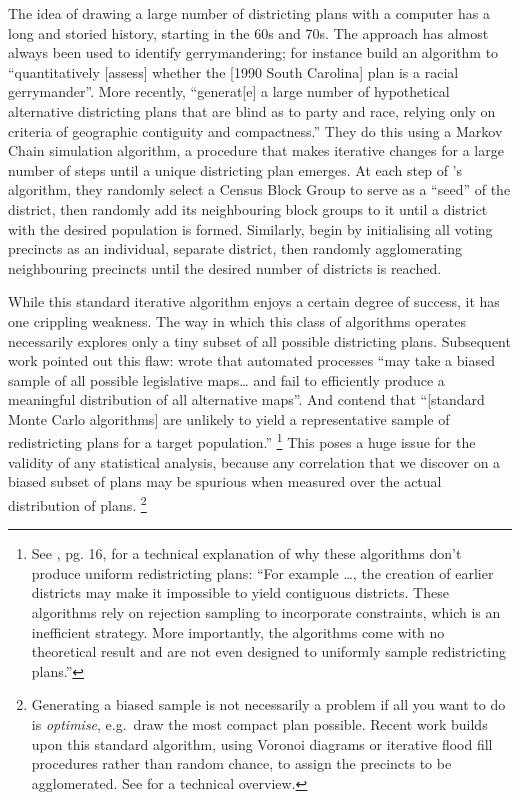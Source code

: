 \documentclass[]{article}
\begin{document}
The idea of drawing a large number of districting plans with a computer
has a long and storied history, starting in the 60s and 70s. The
approach has almost always been used to identify gerrymandering; for
instance \cite{ccd2000} build an algorithm to ``quantitatively
{[}assess{]} whether the {[}1990 South Carolina{]} plan is a racial
gerrymander''. More recently, \cite{cr2013} ``generat{[}e{]} a large
number of hypothetical alternative districting plans that are blind as
to party and race, relying only on criteria of geographic contiguity and
compactness.'' They do this using a Markov Chain simulation algorithm, a
procedure that makes iterative changes for a large number of steps until
a unique districting plan emerges. At each step of
\citeauthor{ccd2000}'s algorithm, they randomly select a Census Block
Group to serve as a ``seed'' of the district, then randomly add its
neighbouring block groups to it until a district with the desired
population is formed. Similarly, \citeauthor{cr2013} begin by
initialising all voting precincts as an individual, separate district,
then randomly agglomerating neighbouring precincts until the desired
number of districts is reached.

While this standard iterative algorithm enjoys a certain degree of
success, it has one crippling weakness. The way in which this class of
algorithms operates necessarily explores only a tiny subset of all
possible districting plans. Subsequent work pointed out this flaw:
\citeauthor{mm2018} wrote that automated processes ``may take a biased
sample of all possible legislative maps\ldots{} and fail to efficiently
produce a meaningful distribution of all alternative maps''. And
\citeauthor{fifieldwp} contend that ``{[}standard Monte Carlo
algorithms{]} are unlikely to yield a representative sample of
redistricting plans for a target population.'' \footnote{See
  \cite{fifieldwp}, pg. 16, for a technical explanation of why these
  algorithms don't produce uniform redistricting plans: ``For example
  \ldots{}, the creation of earlier districts may make it impossible to
  yield contiguous districts. These algorithms rely on rejection
  sampling to incorporate constraints, which is an inefficient strategy.
  More importantly, the algorithms come with no theoretical result and
  are not even designed to uniformly sample redistricting plans.''} This
poses a huge issue for the validity of any statistical analysis, because
any correlation that we discover on a biased subset of plans may be
spurious when measured over the actual distribution of plans. \footnote{Generating
  a biased sample is not necessarily a problem if all you want to do is
  \emph{optimise}, e.g.~draw the most compact plan possible. Recent work
  builds upon this standard algorithm, using Voronoi diagrams or
  iterative flood fill procedures rather than random chance, to assign
  the precincts to be agglomerated. See \cite{lf2019} for a technical
  overview.}
\end{document}
